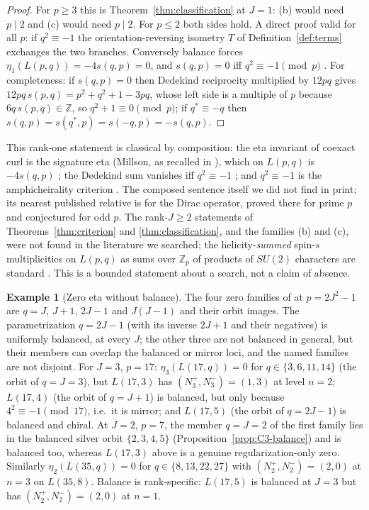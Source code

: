 \documentclass[11pt]{article}
\theoremstyle{definition}
\newtheorem{example}[theorem]{Example}
\newcommand{\Z}{\mathbb Z}
\begin{document}
\begin{proof}
For $p\geq3$ this is Theorem~\ref{thm:classification} at $J=1$: (b)
would need $p\mid2$ and (c) would need $p\mid2$.  For $p\leq2$ both sides
hold.  A direct proof valid for all $p$: if $q^2\equiv-1$ the
orientation-reversing isometry $T$ of Definition~\ref{def:terms}
exchanges the two branches.  Conversely balance forces
$\eta_1(L(p,q))=-4s(q,p)=0$, and $s(q,p)=0$ iff $q^2\equiv-1\pmod p$
\cite[p.~36]{RademacherGrosswald1972}.  For completeness: if $s(q,p)=0$
then Dedekind reciprocity multiplied by $12pq$ gives
$12pq\,s(p,q)=p^2+q^2+1-3pq$, whose left side is a multiple of $p$ because
$6q\,s(p,q)\in\Z$, so $q^2+1\equiv0\pmod p$; if $q^*\equiv-q$ then
$s(q,p)=s(q^*,p)=s(-q,p)=-s(q,p)$.
\end{proof}

This rank-one statement is classical by composition: the eta invariant
of coexact curl is the signature eta (Millson, as recalled in
\cite{Bar2019}), which
on $L(p,q)$ is $-4s(q,p)$ \cite{APS1975,Katase1987,Jeffrey1992}; the
Dedekind sum vanishes iff $q^2\equiv-1$
\cite{RademacherGrosswald1972,Meyer2005,Girstmair2016}; and
$q^2\equiv-1$ is the amphicheirality criterion
\cite{PrzytyckiYasuhara2003,Boldt2017}.  The composed sentence itself we
did not find in print; its nearest published relative is
\cite[Rem.~4.13]{Boldt2017} for the Dirac operator, proved there for
prime $p$ and conjectured for odd $p$.  The rank-$J\geq2$ statements of
Theorems~\ref{thm:criterion} and \ref{thm:classification}, and the
families (b) and (c), were not found in the literature we searched; the
helicity-\emph{summed} spin-$s$ multiplicities on $L(p,q)$ as sums over
$\Z_p$ of products of $SU(2)$ characters are standard
\cite{CastroLashkariMaloney2011Farey,Basu2015,MartinSvesko2020}.  This
is a bounded statement about a search, not a claim of absence.

\begin{example}[Zero eta without balance]
\label{ex:zero-not-balanced}
The four zero families of \cite[Thm.~7.1]{MahmoodP1Collection2026} at
$p=2J^2-1$ are $q=J$, $J+1$, $2J-1$ and $J(J-1)$ and their orbit images.
The parametrization $q=2J-1$ (with its inverse $2J+1$ and their
negatives) is uniformly balanced, at every $J$; the other three are not
balanced in general, but their members can overlap the balanced or
mirror loci, and the named families are not disjoint.  For $J=3$,
$p=17$: $\eta_3(L(17,q))=0$ for $q\in\{3,6,11,14\}$ (the orbit of
$q=J=3$), but $L(17,3)$ has $(N^+_3,N^-_3)=(1,3)$ at level $n=2$;
$L(17,4)$ (the orbit of $q=J+1$) is balanced, but only because
$4^2\equiv-1\pmod{17}$, i.e.\ it is mirror; and $L(17,5)$ (the orbit of
$q=2J-1$) is balanced and chiral.  At $J=2$, $p=7$, the member $q=J=2$
of the first family lies in the balanced silver orbit $\{2,3,4,5\}$
(Proposition~\ref{prop:C3-balance}) and is balanced too, whereas
$L(17,3)$ above is a genuine regularization-only zero.  Similarly
$\eta_2(L(35,q))=0$ for
$q\in\{8,13,22,27\}$ with $(N^+_2,N^-_2)=(2,0)$ at $n=3$ on $L(35,8)$.
Balance is rank-specific: $L(17,5)$ is balanced at $J=3$ but has
$(N^+_2,N^-_2)=(2,0)$ at $n=1$.
\end{example}
\end{document}
